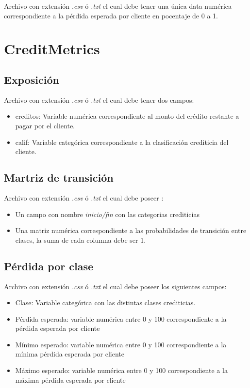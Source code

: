 \documentclass[
  12pt,
]{krantz}
\theoremstyle{definition}
\theoremstyle{definition}
\theoremstyle{definition}
\theoremstyle{remark}
\begin{document}
Archivo con extensión \emph{.csv} ó \emph{.txt} el cual debe tener una única data numérica correspondiente a la pérdida esperada por cliente en pocentaje de 0 a 1.

\hypertarget{creditmetrics-1}{%
\section{CreditMetrics}\label{creditmetrics-1}}

\hypertarget{exposicion-3}{%
\subsection{Exposición}\label{exposicion-3}}

Archivo con extensión \emph{.csv} ó \emph{.txt} el cual debe tener dos campos:

\begin{itemize}
\item
  creditos: Variable numérica correspondiente al monto del crédito restante a pagar por el cliente.
\item
  calif: Variable categórica correspondiente a la clasificación crediticia del cliente.
\end{itemize}

\hypertarget{martriz-de-transicion}{%
\subsection{Martriz de transición}\label{martriz-de-transicion}}

Archivo con extensión \emph{.csv} ó \emph{.txt} el cual debe poseer :

\begin{itemize}
\item
  Un campo con nombre \emph{inicio/fin} con las categorias crediticias
\item
  Una matriz numérica correspondiente a las probabilidades de transición entre clases, la suma de cada columna debe ser 1.
\end{itemize}

\hypertarget{perdida-por-clase-1}{%
\subsection{Pérdida por clase}\label{perdida-por-clase-1}}

Archivo con extensión \emph{.csv} ó \emph{.txt} el cual debe poseer los siguientes campos:

\begin{itemize}
\item
  Clase: Variable categórica con las distintas clases crediticias.
\item
  Pérdida esperada: variable numérica entre 0 y 100 correspondiente a la pérdida esperada por cliente
\item
  Mínimo esperado: variable numérica entre 0 y 100 correspondiente a la mínima pérdida esperada por cliente
\item
  Máximo esperado: variable numérica entre 0 y 100 correspondiente a la máxima pérdida esperada por cliente
\end{itemize}
\end{document}
